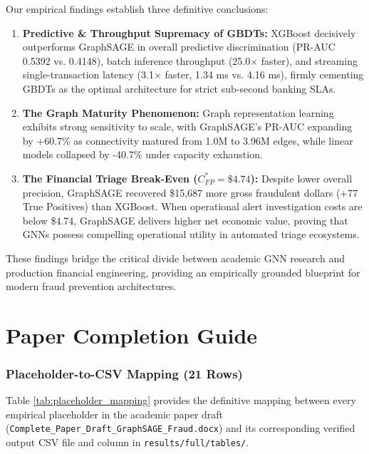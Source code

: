 \documentclass[11pt,a4paper]{report}
\begin{document}
Our empirical findings establish three definitive conclusions:
\begin{enumerate}
    \item \textbf{Predictive \& Throughput Supremacy of GBDTs:} XGBoost decisively outperforms GraphSAGE in overall predictive discrimination (PR-AUC 0.5392 vs. 0.4148), batch inference throughput (25.0$\times$ faster), and streaming single-transaction latency (3.1$\times$ faster, 1.34 ms vs. 4.16 ms), firmly cementing GBDTs as the optimal architecture for strict sub-second banking SLAs.
    \item \textbf{The Graph Maturity Phenomenon:} Graph representation learning exhibits strong sensitivity to scale, with GraphSAGE's PR-AUC expanding by +60.7\% as connectivity matured from 1.0M to 3.96M edges, while linear models collapsed by -40.7\% under capacity exhaustion.
    \item \textbf{The Financial Triage Break-Even ($C_{FP}^* = \$4.74$):} Despite lower overall precision, GraphSAGE recovered \$15,687 more gross fraudulent dollars (+77 True Positives) than XGBoost. When operational alert investigation costs are below \$4.74, GraphSAGE delivers higher net economic value, proving that GNNs possess compelling operational utility in automated triage ecosystems.
\end{enumerate}
These findings bridge the critical divide between academic GNN research and production financial engineering, providing an empirically grounded blueprint for modern fraud prevention architectures.

\part{Paper Completion Guide}

\section{Placeholder-to-CSV Mapping (21 Rows)}
Table \ref{tab:placeholder_mapping} provides the definitive mapping between every empirical placeholder in the academic paper draft (\texttt{Complete\_Paper\_Draft\_GraphSAGE\_Fraud.docx}) and its corresponding verified output CSV file and column in \texttt{results/full/tables/}.
\end{document}
